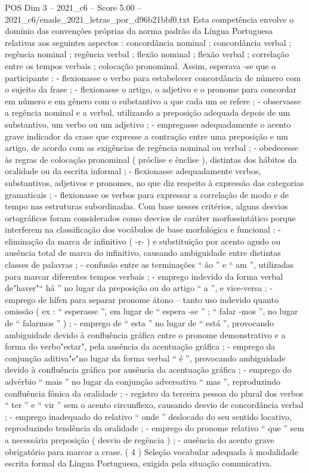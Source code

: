 \begin{textsample}{POS Dim 3 – 2021\_c6 – Score 5.00 – 2021\_c6/enade\_2021\_letras\_por\_d96b21bbf0.txt}
Esta competência envolve o domínio das convenções próprias da norma padrão da Língua Portuguesa relativas aos seguintes aspectos : concordância nominal ; concordância verbal ; regência nominal ; regência verbal ; flexão nominal ; flexão verbal ; correlação entre os tempos verbais ; colocação pronominal.
Assim, esperava -se que o participante : - flexionasse o verbo para estabelecer concordância de número com o sujeito da frase ; - flexionasse o artigo, o adjetivo e o pronome para concordar em número e em gênero com o substantivo a que cada um se refere ; - observasse a regência nominal e a verbal, utilizando a preposição adequada depois de um substantivo, um verbo ou um adjetivo ; - empregasse adequadamente o acento grave indicador da crase que expresse a contração entre uma preposição e um artigo, de acordo com as exigências de regência nominal ou verbal ; - obedecesse às regras de colocação pronominal ( próclise e ênclise ), distintas dos hábitos da oralidade ou da escrita informal ; - flexionasse adequadamente verbos, substantivos, adjetivos e pronomes, no que diz respeito à expressão das categorias gramaticais ; - flexionasse os verbos para expressar a correlação de modo e de tempo nas estruturas subordinadas.
Com base nesses critérios, alguns desvios ortográficos foram considerados como desvios de caráter morfossintático porque interferem na classificação dos vocábulos de base morfológica e funcional : - eliminação da marca de infinitivo ( -r- ) e substituição por acento agudo ou ausência total de marca do infinitivo, causando ambiguidade entre distintas classes de palavras ; - confusão entre as terminações “ ão ” e “ am ”, utilizadas para marcar diferentes tempos verbais ; - emprego indevido da forma verbal de"haver"“ há ” no lugar da preposição ou do artigo “ a ”, e vice-versa ; - emprego de hífen para separar pronome átono – tanto uso indevido quanto omissão ( ex : “ esperasse ”, em lugar de “ espera -se ” ; “ falar -mos ”, no lugar de “ falarmos ” ) ; - emprego de “ esta ” no lugar de “ está ”, provocando ambiguidade devido à confluência gráfica entre o pronome demonstrativo e a forma do verbo"estar", pela ausência da acentuação gráfica ; - emprego da conjunção aditiva"e"no lugar da forma verbal “ é ”, provocando ambiguidade devido à confluência gráfica por ausência da acentuação gráfica ; - emprego do advérbio “ mais ” no lugar da conjunção adversativa “ mas ”, reproduzindo confluência fônica da oralidade ; - registro da terceira pessoa do plural dos verbos “ ter ” e “ vir ” sem o acento circunflexo, causando desvio de concordância verbal ; - emprego inadequado do relativo “ onde ” deslocado do seu sentido locativo, reproduzindo tendência da oralidade ; - emprego do pronome relativo “ que ” sem a necessária preposição ( desvio de regência ) ; - ausência do acento grave obrigatório para marcar a crase. ( 4 ) Seleção vocabular adequada à modalidade escrita formal da Língua Portuguesa, exigida pela situação comunicativa.

\end{textsample}
